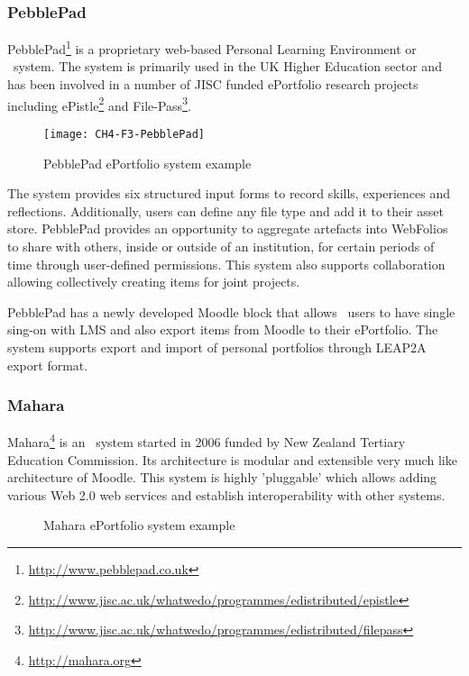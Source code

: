 
\subsubsection{PebblePad}

PebblePad\footnote{\url{http://www.pebblepad.co.uk}} is a proprietary web-based
Personal Learning Environment or \ep~system. The system is primarily
used in the UK Higher Education sector and has been involved in a number of JISC
funded ePortfolio research projects including
ePistle\footnote{\url{http://www.jisc.ac.uk/whatwedo/programmes/edistributed/epistle}}
and File-Pass\footnote{\url{http://www.jisc.ac.uk/whatwedo/programmes/edistributed/filepass}}.

\begin{figure}[htb]
\centering
\texttt{[image: CH4-F3-PebblePad]}
\caption[PebblePad ePortfolio system example]{PebblePad ePortfolio system example
\citep{PebbleLearningLtd}}
\label{fig:ppep}
\end{figure}

The system provides six structured input forms to record skills, experiences and
reflections. Additionally, users can define any file type and add it to their
asset store. PebblePad provides an opportunity to aggregate artefacts into
WebFolios to share with others, inside or outside of an institution, for certain
periods of time through user-defined permissions. This system also supports
collaboration allowing collectively creating items for joint projects.

PebblePad has a newly developed Moodle block that allows \ep~users to
have single sing-on with LMS and also export items from Moodle to their
ePortfolio. The system supports export and import of personal portfolios through
LEAP2A export format.
 
\subsubsection{Mahara}
Mahara\footnote{\url{http://mahara.org}} is an \ep~system started in 2006
funded by New Zealand Tertiary Education Commission. Its architecture is modular
and extensible very much like architecture of Moodle. This system is highly
'pluggable' which allows adding various Web 2.0 web services and establish
interoperability with other systems.

\begin{figure}[htb]
\centering
\setlength\fboxsep{0pt}
\setlength\fboxrule{0.5pt}
\caption{Mahara ePortfolio system example}
\label{fig:maharaep}
\end{figure}

